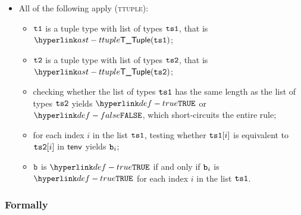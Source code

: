 \begin{itemize}
  \item All of the following apply (\textsc{ttuple}):
  \begin{itemize}
    \item $\vtone$ is a tuple type with list of types $\vtsone$, that is $\TTuple(\vtsone)$;
    \item $\vttwo$ is a tuple type with list of types $\vtstwo$, that is $\TTuple(\vtstwo)$;
    \item checking whether the list of types $\vtsone$ has the same length as the list of types $\vtstwo$ yields $\True$
          or $\False$, which short-circuits the entire rule;
    \item for each index $i$ in the list $\vtsone$, testing whether $\vtsone[i]$ is equivalent to $\vtstwo[i]$ in $\tenv$
          yields $\vb_i$\ProseOrTypeError;
    \item $\vb$ is $\True$ if and only if $\vb_i$ is $\True$ for each index $i$ in the list $\vtsone$.
  \end{itemize}
\end{itemize}

\subsubsection{Formally}
\begin{mathpar}
\end{mathpar}



